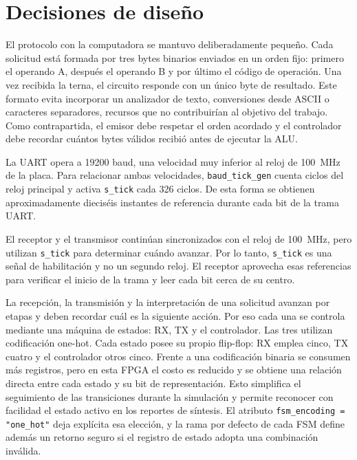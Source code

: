 \section{Decisiones de diseño}

El protocolo con la computadora se mantuvo deliberadamente pequeño.
Cada solicitud está formada por tres bytes binarios enviados en un
orden fijo: primero el operando A, después el operando B y por último
el código de operación. Una vez recibida la terna, el circuito
responde con un único byte de resultado. Este formato evita
incorporar un analizador de texto, conversiones desde ASCII o
caracteres separadores, recursos que no contribuirían al objetivo del
trabajo. Como contrapartida, el emisor debe respetar el orden
acordado y el controlador debe recordar cuántos bytes válidos recibió
antes de ejecutar la ALU.

La UART opera a \num{19200} baud, una velocidad muy inferior al reloj
de \SI{100}{\mega\hertz} de la placa. Para relacionar ambas
velocidades, \texttt{baud\_tick\_gen} cuenta ciclos del reloj
principal y activa \texttt{s\_tick} cada 326 ciclos. De esta forma se
obtienen aproximadamente dieciséis instantes de referencia durante
cada bit de la trama UART.

El receptor y el transmisor continúan sincronizados con el reloj de
\SI{100}{\mega\hertz}, pero utilizan \texttt{s\_tick} para determinar
cuándo avanzar. Por lo tanto, \texttt{s\_tick} es una señal de
habilitación y no un segundo reloj. El receptor aprovecha esas
referencias para verificar el inicio de la trama y leer cada bit
cerca de su centro.

La recepción, la transmisión y la interpretación de una solicitud
avanzan por etapas y deben recordar cuál es la siguiente acción. Por
eso cada una se controla mediante una máquina de estados: RX, TX y el
controlador. Las tres utilizan codificación one-hot. Cada estado
posee su propio flip-flop: RX emplea cinco, TX cuatro y el
controlador otros cinco. Frente a una codificación binaria se
consumen más registros, pero en esta FPGA el costo es reducido y se
obtiene una relación directa entre cada estado y su bit de
representación. Esto simplifica el seguimiento de las transiciones
durante la simulación y permite reconocer con facilidad el estado
activo en los reportes de síntesis. El atributo \texttt{fsm\_encoding
= "one\_hot"} deja explícita esa elección, y la rama por defecto de
cada FSM define además un retorno seguro si el registro de estado
adopta una combinación inválida.

